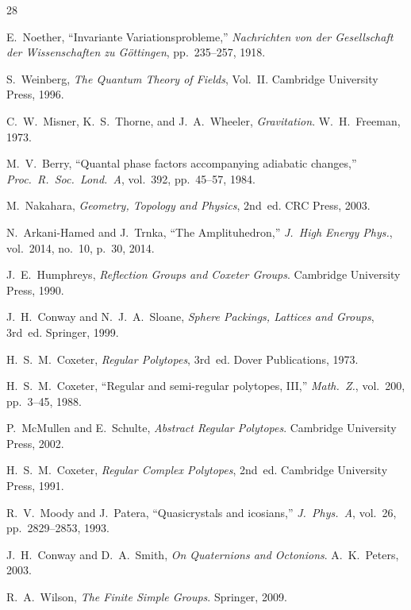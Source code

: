 \documentclass[12pt,a4paper]{article}
\begin{document}
\newpage
\begin{thebibliography}{28}

E.~Noether,
``Invariante Variationsprobleme,''
\textit{Nachrichten von der Gesellschaft der Wissenschaften zu G\"ottingen},
pp.~235--257, 1918.

S.~Weinberg,
\textit{The Quantum Theory of Fields}, Vol.~II\@.
Cambridge University Press, 1996.

C.~W.~Misner, K.~S.~Thorne, and J.~A.~Wheeler,
\textit{Gravitation}.
W.~H.~Freeman, 1973.

M.~V.~Berry,
``Quantal phase factors accompanying adiabatic changes,''
\textit{Proc.\ R.\ Soc.\ Lond.\ A}, vol.~392, pp.~45--57, 1984.

M.~Nakahara,
\textit{Geometry, Topology and Physics}, 2nd~ed.
CRC Press, 2003.

N.~Arkani-Hamed and J.~Trnka,
``The Amplituhedron,''
\textit{J.\ High Energy Phys.}, vol.~2014, no.~10, p.~30, 2014.

J.~E.~Humphreys,
\textit{Reflection Groups and Coxeter Groups}.
Cambridge University Press, 1990.

J.~H.~Conway and N.~J.~A.~Sloane,
\textit{Sphere Packings, Lattices and Groups}, 3rd~ed.
Springer, 1999.

H.~S.~M.~Coxeter,
\textit{Regular Polytopes}, 3rd~ed.
Dover Publications, 1973.

H.~S.~M.~Coxeter,
``Regular and semi-regular polytopes, III,''
\textit{Math.\ Z.}, vol.~200, pp.~3--45, 1988.

P.~McMullen and E.~Schulte,
\textit{Abstract Regular Polytopes}.
Cambridge University Press, 2002.

H.~S.~M.~Coxeter,
\textit{Regular Complex Polytopes}, 2nd~ed.
Cambridge University Press, 1991.

R.~V.~Moody and J.~Patera,
``Quasicrystals and icosians,''
\textit{J.\ Phys.\ A}, vol.~26, pp.~2829--2853, 1993.

J.~H.~Conway and D.~A.~Smith,
\textit{On Quaternions and Octonions}.
A.~K.~Peters, 2003.

R.~A.~Wilson,
\textit{The Finite Simple Groups}.
Springer, 2009.


\end{thebibliography}
\end{document}
